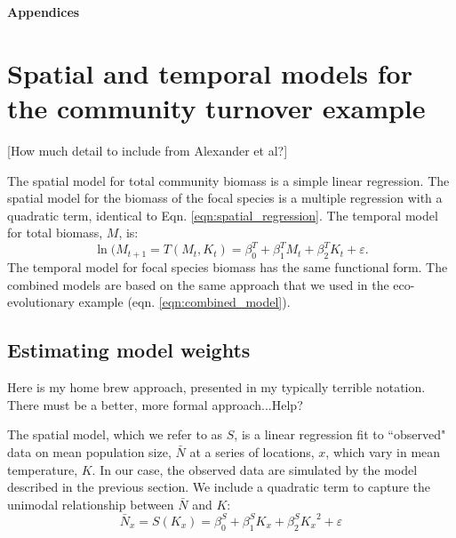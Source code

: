 \documentclass[11pt]{article}
\begin{document}

\clearpage 
\newpage 

\setcounter{page}{1}
\setcounter{equation}{0}
\setcounter{figure}{0}
\setcounter{section}{0}
\setcounter{table}{0}

\centerline{\Large \textbf{Appendices}}

\vspace{0.4in} 

\renewcommand{\theequation}{A-\arabic{equation}}
\renewcommand{\thetable}{A-\arabic{table}}
\renewcommand{\thefigure}{A-\arabic{figure}}
\renewcommand{\thesection}{\Alph{section}}

\section{Spatial and temporal models for the community turnover example}\label{metacomm}

[How much detail to include from Alexander et al?]

The spatial model for total community biomass is a simple linear regression. The spatial model for the biomass of the focal species is a multiple regression with a quadratic term, identical to Eqn. \ref{eqn:spatial_regression}. The temporal model for total biomass, $M$, is:
 \begin{equation}
 \ln(M_{t+1} = T(M_{t},K_t) = \beta^T_0 +  \beta^T_1 M_t +\beta^T_2 K_t  +  \varepsilon .
 \label{eqn:community_temporal_regression}
 \end{equation}
The temporal model for focal species biomass has the same functional form. The combined models are based on the same approach that we used in the eco-evolutionary example (eqn. \ref{eqn:combined_model}).

\subsection{Estimating model weights}\label{weights}

Here is my home brew approach, presented in my typically terrible notation. There must be a better, more formal approach...Help?

The spatial model, which we refer to as $S$, is a linear regression fit to ``observed" data on mean population size, $\bar{N}$ at a series of locations, $x$, which vary in mean temperature, $K$. In our case, the observed data are simulated by the model described in the previous section. We include a quadratic term to capture the unimodal relationship between  $\bar{N}$ and $K$:
 \begin{equation}
 \bar{N}_x = S(K_x) = \beta^S_0 +  \beta^S_1 K_x +\beta^S_2 {K_x}^2 + \varepsilon
 \label{eqn:spatial_regression}
 \end{equation}
\end{document}
